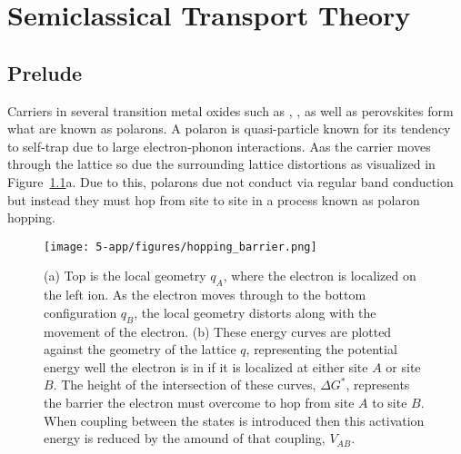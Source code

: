 \chapter{Semiclassical Transport Theory}

\section{Prelude}

Carriers in several transition metal oxides such as , , as well as  perovskites form what are known as polarons. A polaron is quasi-particle known for its tendency to self-trap due to large electron-phonon interactions.  Aas the carrier moves through the lattice so due the surrounding lattice distortions as visualized in Figure~\ref{app:fig:hop}a. Due to this, polarons due not conduct via regular band conduction but instead they must hop from site to site in a process known as polaron hopping.

\begin{figure}[H]
    \centering
    \texttt{[image: 5-app/figures/hopping\_barrier.png]}
    \caption{(a) Top is the local geometry $q_A$, where the electron is localized on the left ion. As the electron moves through to the bottom configuration $q_B$, the local geometry distorts along with the movement of the electron. (b) These energy curves are plotted against the geometry of the lattice $q$, representing the potential energy well the electron is in if it is localized at either site $A$ or site $B$. The height of the intersection of these curves, $\Delta G^*$, represents the barrier the electron must overcome to hop from site $A$ to site $B$. When coupling between the states is introduced then this activation energy is reduced by the amound of that coupling, $V_{AB}$.}
    \label{app:fig:hop}
\end{figure}

